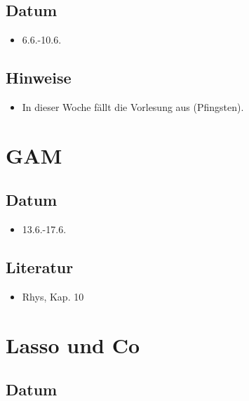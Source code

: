 \documentclass[
]{book}
\providecommand{\tightlist}{%
  \setlength{\itemsep}{0pt}\setlength{\parskip}{0pt}}
\begin{document}
\hypertarget{datum-11}{%
\subsection{Datum}\label{datum-11}}

\begin{itemize}
\tightlist
\item
  6.6.-10.6.
\end{itemize}

\hypertarget{hinweise-4}{%
\subsection{Hinweise}\label{hinweise-4}}

\begin{itemize}
\tightlist
\item
  In dieser Woche fällt die Vorlesung aus (Pfingsten).
\end{itemize}

\hypertarget{gam}{%
\section{GAM}\label{gam}}

\hypertarget{datum-12}{%
\subsection{Datum}\label{datum-12}}

\begin{itemize}
\tightlist
\item
  13.6.-17.6.
\end{itemize}

\hypertarget{literatur-11}{%
\subsection{Literatur}\label{literatur-11}}

\begin{itemize}
\tightlist
\item
  Rhys, Kap. 10
\end{itemize}

\hypertarget{lasso-und-co}{%
\section{Lasso und Co}\label{lasso-und-co}}

\hypertarget{datum-13}{%
\subsection{Datum}\label{datum-13}}
\end{document}
